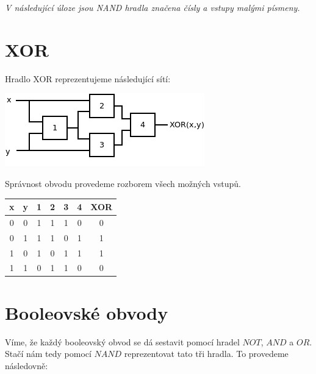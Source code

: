 \documentclass{scrartcl}
\begin{document}
\textit{V následující úloze jsou NAND hradla značena čísly a vstupy malými písmeny.}
\section{XOR}
Hradlo XOR reprezentujeme následující sítí:

\begin{center}
    \includegraphics[width=0.5\linewidth]{nand_to_xor}
\end{center}

Správnost obvodu provedeme rozborem všech možných vstupů.

\begin{center}
    \begin{tabular}{ c | c | c | c | c | c | c }
        x & y & 1 & 2 & 3 & 4 & XOR \\ \hline
        0 & 0 & 1 & 1 & 1 & 0 & 0   \\
        0 & 1 & 1 & 1 & 0 & 1 & 1   \\
        1 & 0 & 1 & 0 & 1 & 1 & 1   \\
        1 & 1 & 0 & 1 & 1 & 0 & 0   
    \end{tabular}
\end{center}

\section{Booleovské obvody}
Víme, že každý booleovský obvod se dá sestavit pomocí hradel $NOT$, $AND$ a $OR$. Stačí nám tedy pomocí $NAND$ reprezentovat tato tři hradla. To provedeme následovně:
\end{document}
